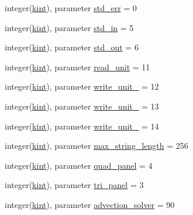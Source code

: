 \begin{DoxyCompactItemize}
\item 
integer(\hyperlink{classnumberkindsmodule_a50957e2e9ebdf9a5c6da0641adf3a1b3}{kint}), parameter \hyperlink{classnumberkindsmodule_aae6e3183138e223eec9e8f3d8d123bba}{std\+\_\+err} = 0
\item 
integer(\hyperlink{classnumberkindsmodule_a50957e2e9ebdf9a5c6da0641adf3a1b3}{kint}), parameter \hyperlink{classnumberkindsmodule_aeee3045e62a09578c8657f47d61bd423}{std\+\_\+in} = 5
\item 
integer(\hyperlink{classnumberkindsmodule_a50957e2e9ebdf9a5c6da0641adf3a1b3}{kint}), parameter \hyperlink{classnumberkindsmodule_afde1037e03524a31f4c27989e4651732}{std\+\_\+out} = 6
\item 
integer(\hyperlink{classnumberkindsmodule_a50957e2e9ebdf9a5c6da0641adf3a1b3}{kint}), parameter \hyperlink{classnumberkindsmodule_ae275628322d1dedf50a022f740d88e22}{read\+\_\+unit} = 11
\item 
integer(\hyperlink{classnumberkindsmodule_a50957e2e9ebdf9a5c6da0641adf3a1b3}{kint}), parameter \hyperlink{classnumberkindsmodule_a761d497049d5f7ead78a5088ec7ba6a2}{write\+\_\+unit\+\_} = 12
\item 
integer(\hyperlink{classnumberkindsmodule_a50957e2e9ebdf9a5c6da0641adf3a1b3}{kint}), parameter \hyperlink{classnumberkindsmodule_a9b3dadbfd9070ddcc5614a70b8b175fb}{write\+\_\+unit\+\_} = 13
\item 
integer(\hyperlink{classnumberkindsmodule_a50957e2e9ebdf9a5c6da0641adf3a1b3}{kint}), parameter \hyperlink{classnumberkindsmodule_aaed367cd86772cc92f06046eba31864e}{write\+\_\+unit\+\_} = 14
\item 
integer(\hyperlink{classnumberkindsmodule_a50957e2e9ebdf9a5c6da0641adf3a1b3}{kint}), parameter \hyperlink{classnumberkindsmodule_acdff91cebc15eb3a5c7a453345454ae4}{max\+\_\+string\+\_\+length} = 256
\item 
integer(\hyperlink{classnumberkindsmodule_a50957e2e9ebdf9a5c6da0641adf3a1b3}{kint}), parameter \hyperlink{classnumberkindsmodule_ab3062c50a0b035fca7077f04a8e49329}{quad\+\_\+panel} = 4
\item 
integer(\hyperlink{classnumberkindsmodule_a50957e2e9ebdf9a5c6da0641adf3a1b3}{kint}), parameter \hyperlink{classnumberkindsmodule_ac5f366e59a1a142274f1abf9a3895188}{tri\+\_\+panel} = 3
\item 
integer(\hyperlink{classnumberkindsmodule_a50957e2e9ebdf9a5c6da0641adf3a1b3}{kint}), parameter \hyperlink{classnumberkindsmodule_a2bea0cc446c8e3bad6c460cb26ee0596}{advection\+\_\+solver} = 90
\item 

\end{DoxyCompactItemize}
